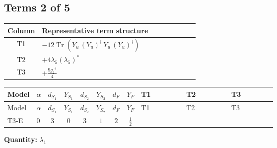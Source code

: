 \documentclass[8pt]{article}
\begin{document}
\begin{landscape}
\subsection*{Terms 2 of 5}
\begin{center}
\begin{tabular}{@{}c >{\raggedright\arraybackslash}p{0.82\linewidth}@{}}
\toprule
Column & Representative term structure \\
\midrule
T1 & \(\displaystyle -12 \operatorname{Tr}\!\left({Y_u}\,\left({Y_u}\right)^{\dagger}\,{Y_u}\,\left({Y_u}\right)^{\dagger}\right)\) \\
\midrule
T2 & \(\displaystyle +4 {\lambda_5} \left({\lambda_5}\right)^{*}\) \\
\midrule
T3 & \(\displaystyle +\frac{9 {g_2}^4}{4}\) \\
\midrule
\bottomrule
\end{tabular}
\end{center}
\smallskip
\tiny
\begin{longtable}{@{}llcccccc >{\raggedright\arraybackslash}p{0.21\linewidth} >{\raggedright\arraybackslash}p{0.21\linewidth} >{\raggedright\arraybackslash}p{0.21\linewidth}@{}}
\toprule
Model & $\alpha$ & $d_{S_1}$ & $Y_{S_1}$ & $d_{S_2}$ & $Y_{S_2}$ & $d_F$ & $Y_F$ & T1 & T2 & T3 \\
\midrule
\endfirsthead
\toprule
Model & $\alpha$ & $d_{S_1}$ & $Y_{S_1}$ & $d_{S_2}$ & $Y_{S_2}$ & $d_F$ & $Y_F$ & T1 & T2 & T3 \\
\midrule
\endhead
T3-E & $0$ & $3$ & $0$ & $3$ & $1$ & $2$ & $\frac{1}{2}$ & \scriptsize\adjustbox{max width=\linewidth}{$\begin{gathered} -12 \operatorname{Tr}\!\left({Y_u}\,\left({Y_u}\right)^{\dagger}\,{Y_u}\,\left({Y_u}\right)^{\dagger}\right)\end{gathered}$} & \scriptsize\adjustbox{max width=\linewidth}{$\begin{gathered} +4 {\lambda_5} \left({\lambda_5}\right)^{*}\end{gathered}$} & \scriptsize\adjustbox{max width=\linewidth}{$\begin{gathered} +\frac{9 {g_2}^4}{4}\end{gathered}$} \\
\midrule
\bottomrule
\end{longtable}
\clearpage
\noindent\textbf{Quantity: }$\lambda_1$\par\smallskip

\end{landscape}
\end{document}
